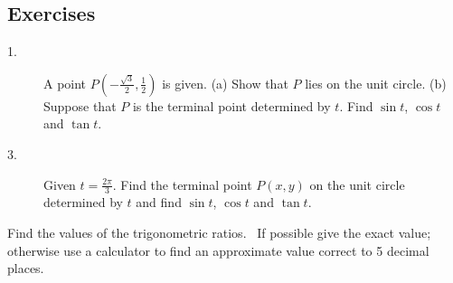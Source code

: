 %
%
%
%
%
%
%
%

\subsection{Exercises}

\begin{description}
	\item [1.] A point $P ( -\frac{\sqrt{3}}{2} ,\frac{1}{2})$ is given. (a) Show that $P$ lies on the unit circle. (b) Suppose that $P$ is the terminal point determined by $t$. Find $\sin  t$, $\cos  t$ and $\tan  t\text{.}$ 
	
	\item [3.] Given $t =\frac{2 \pi }{3}\text{.}$ Find the terminal point $P (x ,y)$ on the unit circle determined by $t$ and find $\sin  t$, $\cos  t$ and $\tan  t\text{.}$ \end{description}

Find the values of the trigonometric ratios.
\ If possible give the exact value; otherwise use a calculator to find an approximate value correct to 5 decimal
places. 


